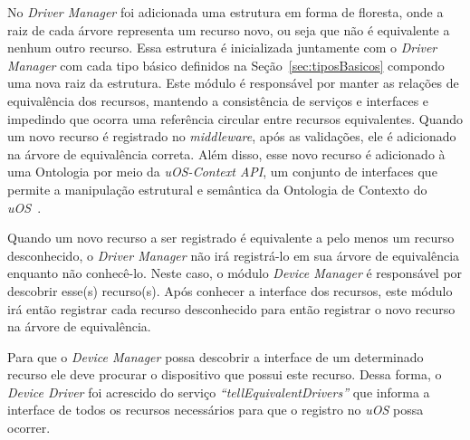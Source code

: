 No \emph{Driver Manager} foi adicionada uma estrutura em forma de floresta, onde a raiz de cada árvore representa um recurso novo, ou seja que não é equivalente a nenhum outro recurso. Essa estrutura é inicializada juntamente com o \emph{Driver Manager} com cada tipo básico definidos na Seção~\ref{sec:tiposBasicos} compondo uma nova raiz da estrutura. Este módulo é responsável por manter as relações de equivalência dos recursos, mantendo a consistência de serviços e interfaces e impedindo que ocorra uma referência circular entre recursos equivalentes. Quando um novo recurso é registrado no \emph{middleware}, após as validações, ele é adicionado na árvore de equivalência correta. Além disso, esse novo recurso é adicionado à uma Ontologia por meio da \emph{uOS-Context API}, um conjunto de interfaces que permite a manipulação estrutural e semântica da Ontologia de Contexto do \emph{uOS}~\cite{ozakisbcup2011}.

Quando um novo recurso a ser registrado é equivalente a pelo menos um recurso desconhecido, o \emph{Driver Manager} não irá registrá-lo em sua árvore de equivalência enquanto não conhecê-lo. Neste caso, o módulo \emph{Device Manager} é responsável por descobrir esse(s) recurso(s). Após conhecer a interface dos recursos, este módulo irá então registrar cada recurso desconhecido para então registrar o novo recurso na árvore de equivalência.

Para que o \emph{Device Manager} possa descobrir a interface de um determinado recurso ele deve procurar o dispositivo que possui este recurso. Dessa forma, o \emph{Device Driver} foi acrescido do serviço \emph{``tellEquivalentDrivers''} que informa a interface de todos os recursos necessários para que o registro no \emph{uOS} possa ocorrer.